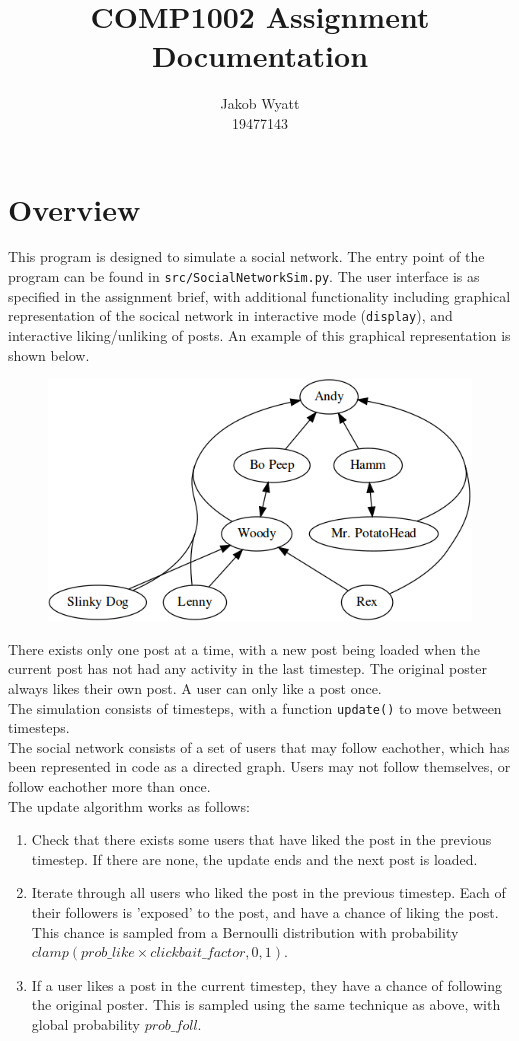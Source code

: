 \documentclass{article}
\title{COMP1002 Assignment\\Documentation}
\author{Jakob Wyatt\\19477143}
\begin{document}
\maketitle
\pagebreak
\section{Overview}
\label{sec:Overview}
This program is designed to simulate a social network.
The entry point of the program can be found in \texttt{src/SocialNetworkSim.py}.
The user interface is as specified in the assignment brief,
with additional functionality including graphical representation
of the socical network in interactive mode (\texttt{display}), and interactive liking/unliking 
of posts. An example of this graphical representation is shown below.\\
\begin{figure}[H]
\centering
\includegraphics[width=.7\linewidth]{display}
\end{figure}
There exists only one post at a time, with a new post being loaded when the current
post has not had any activity in the last timestep. The original poster always
likes their own post. A user can only like a post once.\\
The simulation consists
of timesteps, with a function \texttt{update()} to move between timesteps.\\
The social network consists of a set of users that may follow eachother,
which has been represented in code as a directed graph. Users may not follow themselves,
or follow eachother more than once.\\
The update algorithm works as follows:
\begin{enumerate}
    \item Check that there exists some users that have liked the post in the previous timestep.
            If there are none, the update ends and the next post is loaded.
    \item Iterate through all users who liked the post in the previous timestep.
            Each of their followers is 'exposed' to the post, and have a chance of liking the post.
            This chance is sampled from a Bernoulli distribution with probability
            $\mathit{clamp}(\mathit{prob\_like} \times \mathit{clickbait\_factor}, 0, 1)$.
    \item If a user likes a post in the current timestep, they have a chance of following the
            original poster. This is sampled using the same technique as above, with global probability
            $\mathit{prob\_foll}$.
\end{enumerate}
\end{document}
